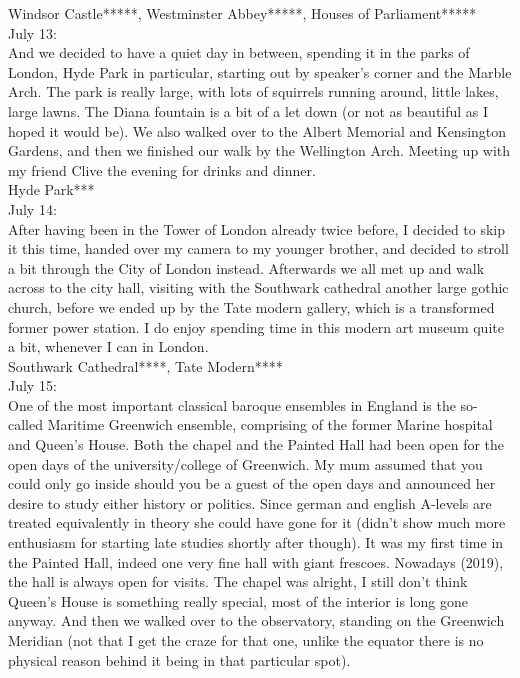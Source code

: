 Windsor Castle*****, Westminster Abbey*****, Houses of Parliament*****\\

July 13:\\
And we decided to have a quiet day in between, spending it in the parks of London, Hyde Park in particular, starting out by speaker's corner and the Marble Arch. The park is really large, with lots of squirrels running around, little lakes, large lawns. The Diana fountain is a bit of a let down (or not as beautiful as I hoped it would be). We also walked over to the Albert Memorial and Kensington Gardens, and then we finished our walk by the Wellington Arch. Meeting up with my friend Clive the evening for drinks and dinner.\\

Hyde Park***\\

July 14:\\
After having been in the Tower of London already twice before, I decided to skip it this time, handed over my camera to my younger brother, and decided to stroll a bit through the City of London instead. Afterwards we all met up and walk across to the city hall, visiting with the Southwark cathedral another large gothic church, before we ended up by the Tate modern gallery, which is a transformed former power station. I do enjoy spending time in this modern art museum quite a bit, whenever I can in London.\\

Southwark Cathedral****,  Tate Modern****\\

July 15:\\
One of the most important classical baroque ensembles in England is the so-called Maritime Greenwich ensemble, comprising of the former Marine hospital and Queen's House. Both the chapel and the Painted Hall had been open for the open days of the university/college of Greenwich. My mum assumed that you could only go inside should you be a guest of the open days and announced her desire to study either history or politics. Since german and english A-levels are treated equivalently in theory she could have gone for it (didn't show much more enthusiasm for starting late studies shortly after though). It was my first time in the Painted Hall, indeed one very fine hall with giant frescoes. Nowadays (2019), the hall is always open for visits. The chapel was alright, I still don't think Queen's House is something really special, most of the interior is long gone anyway. And then we walked over to the observatory, standing on the Greenwich Meridian (not that I get the craze for that one, unlike the equator there is no physical reason behind it being in that particular spot).\\

